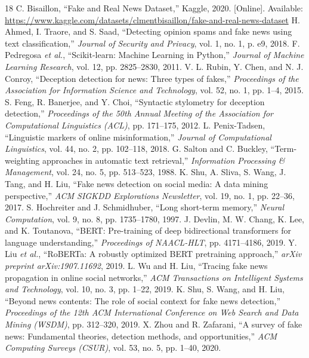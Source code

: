 \documentclass[conference]{IEEEtran}
\begin{document}
\begin{thebibliography}{18}
 C. Bisaillon, ``Fake and Real News Dataset,'' Kaggle, 2020. [Online]. Available: \url{https://www.kaggle.com/datasets/clmentbisaillon/fake-and-real-news-dataset}
 H. Ahmed, I. Traore, and S. Saad, ``Detecting opinion spams and fake news using text classification,'' \textit{Journal of Security and Privacy}, vol. 1, no. 1, p. e9, 2018.
 F. Pedregosa \textit{et al.}, ``Scikit-learn: Machine Learning in Python,'' \textit{Journal of Machine Learning Research}, vol. 12, pp. 2825--2830, 2011.
 V. L. Rubin, Y. Chen, and N. J. Conroy, ``Deception detection for news: Three types of fakes,'' \textit{Proceedings of the Association for Information Science and Technology}, vol. 52, no. 1, pp. 1--4, 2015.
 S. Feng, R. Banerjee, and Y. Choi, ``Syntactic stylometry for deception detection,'' \textit{Proceedings of the 50th Annual Meeting of the Association for Computational Linguistics (ACL)}, pp. 171--175, 2012.
 L. Penix-Tadsen, ``Linguistic markers of online misinformation,'' \textit{Journal of Computational Linguistics}, vol. 44, no. 2, pp. 102--118, 2018.
 G. Salton and C. Buckley, ``Term-weighting approaches in automatic text retrieval,'' \textit{Information Processing \& Management}, vol. 24, no. 5, pp. 513--523, 1988.
 K. Shu, A. Sliva, S. Wang, J. Tang, and H. Liu, ``Fake news detection on social media: A data mining perspective,'' \textit{ACM SIGKDD Explorations Newsletter}, vol. 19, no. 1, pp. 22--36, 2017.
 S. Hochreiter and J. Schmidhuber, ``Long short-term memory,'' \textit{Neural Computation}, vol. 9, no. 8, pp. 1735--1780, 1997.
 J. Devlin, M. W. Chang, K. Lee, and K. Toutanova, ``BERT: Pre-training of deep bidirectional transformers for language understanding,'' \textit{Proceedings of NAACL-HLT}, pp. 4171--4186, 2019.
 Y. Liu \textit{et al.}, ``RoBERTa: A robustly optimized BERT pretraining approach,'' \textit{arXiv preprint arXiv:1907.11692}, 2019.
 L. Wu and H. Liu, ``Tracing fake news propagation in online social networks,'' \textit{ACM Transactions on Intelligent Systems and Technology}, vol. 10, no. 3, pp. 1--22, 2019.
 K. Shu, S. Wang, and H. Liu, ``Beyond news contents: The role of social context for fake news detection,'' \textit{Proceedings of the 12th ACM International Conference on Web Search and Data Mining (WSDM)}, pp. 312--320, 2019.
 X. Zhou and R. Zafarani, ``A survey of fake news: Fundamental theories, detection methods, and opportunities,'' \textit{ACM Computing Surveys (CSUR)}, vol. 53, no. 5, pp. 1--40, 2020.

\end{thebibliography}
\end{document}
